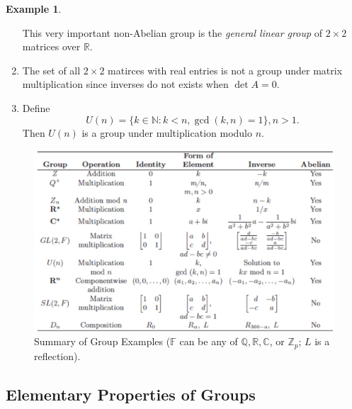 \documentclass{article}
\newtheorem{theorem}{Theorem}[section]
\theoremstyle{definition}
\newtheorem{example}{Example}[section]
\begin{document}
\begin{example}
\begin{enumerate}
    This very important non-Abelian group is the \textit{general linear group} of $2\times2$ matrices over $\mathbb{R}$.
    
    \item The set of all $2\times2$ matirces with real entries is not a group under matrix multiplication since inverses do not exists when $\det A = 0$.
    
    \item Define
    \begin{equation*}
        U(n) = \{k \in \mathbb{N}: k<n, \gcd(k,n)=1\}, n>1.
    \end{equation*}
    Then $U(n)$ is a group under multiplication modulo $n$.
\end{enumerate}
\end{example}

\begin{figure}[!htbp]
    \centering
    \includegraphics[width=\textwidth]{figures/group_example.png}
    \caption{Summary of Group Examples ($\mathbb{F}$ can be any of $\mathbb{Q,R,C}$, or $\mathbb{Z}_p$; $L$ is a reflection).} 
    \label{group_example}
\end{figure}

\subsection{Elementary Properties of Groups}
\end{document}
